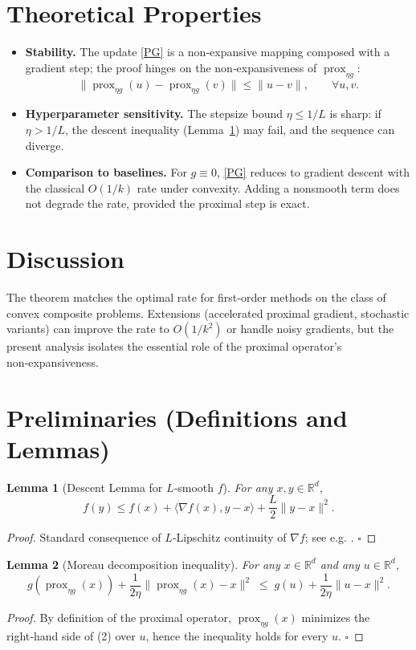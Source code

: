 \documentclass{article}
\newtheorem{lemma}{Lemma}
\newcommand{\prox}{\operatorname{prox}}
\newcommand{\grad}{\nabla}
\begin{document}
\section*{Theoretical Properties}
\begin{itemize}[noitemsep]
\item \textbf{Stability.} The update \eqref{PG} is a non‑expansive mapping composed with a gradient step; the proof hinges on the non‑expansiveness of $\prox_{\eta g}$:
\[
\|\prox_{\eta g}(u)-\prox_{\eta g}(v)\|\le\|u-v\|,\qquad\forall u,v.
\tag{NE}
\]
\item \textbf{Hyperparameter sensitivity.} The stepsize bound $\eta\le1/L$ is sharp: if $\eta>1/L$, the descent inequality (Lemma~\ref{lem:descent}) may fail, and the sequence can diverge.
\item \textbf{Comparison to baselines.} For $g\equiv0$, \eqref{PG} reduces to gradient descent with the classical $O(1/k)$ rate under convexity. Adding a nonsmooth term does not degrade the rate, provided the proximal step is exact.
\end{itemize}

\section*{Discussion}
The theorem matches the optimal rate for first‑order methods on the class of convex composite problems. Extensions (accelerated proximal gradient, stochastic variants) can improve the rate to $O(1/k^2)$ or handle noisy gradients, but the present analysis isolates the essential role of the proximal operator’s non‑expansiveness.

\newpage
\section*{Preliminaries (Definitions and Lemmas)}
\begin{lemma}[Descent Lemma for $L$‑smooth $f$]
\label{lem:descent}
For any $x,y\in\mathbb{R}^d$,
\[
f(y)\le f(x)+\langle\grad f(x),y-x\rangle+\frac{L}{2}\|y-x\|^2 .
\]
\end{lemma}
\begin{proof}
Standard consequence of $L$‑Lipschitz continuity of $\grad f$; see e.g. \cite{Nesterov2004}. \hfill$\square$
\end{proof}

\begin{lemma}[Moreau decomposition inequality]
\label{lem:prox-ineq}
For any $x\in\mathbb{R}^d$ and any $u\in\mathbb{R}^d$,
\[
g(\prox_{\eta g}(x)) + \frac{1}{2\eta}\| \prox_{\eta g}(x)-x\|^2
\;\le\;
g(u) + \frac{1}{2\eta}\|u-x\|^2 .
\tag{2}
\]
\end{lemma}
\begin{proof}
By definition of the proximal operator, $\prox_{\eta g}(x)$ minimizes the right‑hand side of (2) over $u$, hence the inequality holds for every $u$. \hfill$\square$
\end{proof}
\end{document}
